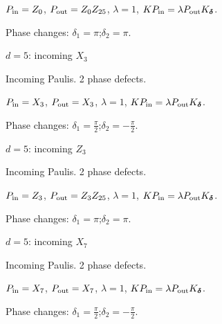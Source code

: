 $P_{\rm in}=Z_{0}$, \quad $P_{\rm out}=Z_{0}Z_{25}$, \quad $\lambda=1$, \qquad $K P_{\rm in}=\lambda P_{\rm out}K_{\boldsymbol\delta}$.
\par\smallskip\begin{minipage}{.98\linewidth}\small Phase changes: $\delta_{1}=\pi$;\quad $\delta_{2}=\pi$.\end{minipage}
\vfill
{\footnotesize\texttt{}}
\newpage
{}
{\Large $d=5$: incoming $X_{3}$}\par
Incoming Paulis. 2 phase defects.
\begin{center}
\end{center}
\vspace{-1mm}
$P_{\rm in}=X_{3}$, \quad $P_{\rm out}=X_{3}$, \quad $\lambda=1$, \qquad $K P_{\rm in}=\lambda P_{\rm out}K_{\boldsymbol\delta}$.
\par\smallskip\begin{minipage}{.98\linewidth}\small Phase changes: $\delta_{1}=\frac{\pi}{2}$;\quad $\delta_{2}=-\frac{\pi}{2}$.\end{minipage}
\vfill
{\footnotesize\texttt{}}
\newpage
{}
{\Large $d=5$: incoming $Z_{3}$}\par
Incoming Paulis. 2 phase defects.
\begin{center}
\end{center}
\vspace{-1mm}
$P_{\rm in}=Z_{3}$, \quad $P_{\rm out}=Z_{3}Z_{25}$, \quad $\lambda=1$, \qquad $K P_{\rm in}=\lambda P_{\rm out}K_{\boldsymbol\delta}$.
\par\smallskip\begin{minipage}{.98\linewidth}\small Phase changes: $\delta_{1}=\pi$;\quad $\delta_{2}=\pi$.\end{minipage}
\vfill
{\footnotesize\texttt{}}
\newpage
{}
{\Large $d=5$: incoming $X_{7}$}\par
Incoming Paulis. 2 phase defects.
\begin{center}
\end{center}
\vspace{-1mm}
$P_{\rm in}=X_{7}$, \quad $P_{\rm out}=X_{7}$, \quad $\lambda=1$, \qquad $K P_{\rm in}=\lambda P_{\rm out}K_{\boldsymbol\delta}$.
\par\smallskip\begin{minipage}{.98\linewidth}\small Phase changes: $\delta_{1}=\frac{\pi}{2}$;\quad $\delta_{2}=-\frac{\pi}{2}$.\end{minipage}
